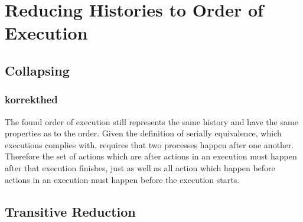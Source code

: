 \chapter{Reducing Histories to Order of Execution}
\label{chap:order-of-execution}
\section{Collapsing}
\subsection{korrekthed}
The found order of execution still represents the same history and have the same properties as to the order. Given the definition of serially equivalence, which executions complies with, requires that two processes happen after one another. Therefore the set of actions which are after actions in an execution must happen after that execution finishes, just as well as all action which happen before actions in an execution must happen before the execution starts. 
\section{Transitive Reduction}